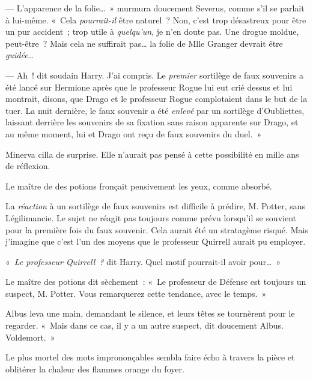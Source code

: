 --- L'apparence de la folie…~»
murmura doucement Severus, comme s'il se parlait à lui-même.
«~Cela \emph{pourrait-il} être naturel~?
Non, c'est trop désastreux pour être un pur accident~; trop utile à \emph{quelqu'un}, je n'en doute pas.
Une drogue moldue, peut-être~?
Mais cela ne suffirait pas… la folie de Mlle Granger devrait être \emph{guidée}…

--- Ah~! dit soudain Harry.
J'ai compris.
Le \emph{premier} sortilège de faux souvenirs a été lancé sur Hermione après que le professeur Rogue lui eut crié dessus et lui montrait, disons, que Drago et le professeur Rogue complotaient dans le but de la tuer.
La nuit dernière, le faux souvenir a été \emph{enlevé} par un sortilège d'Oubliettes, laissant derrière les souvenirs de sa fixation sans raison apparente sur Drago, et au même moment, lui et Drago ont reçu de faux souvenirs du duel.~»

Minerva cilla de surprise.
Elle n'aurait pas pensé à cette possibilité en mille ans de réflexion.

Le maître de des potions fronçait pensivement les yeux, comme absorbé.

La \emph{réaction} à un sortilège de faux souvenirs est difficile à prédire, M. Potter, sans Légilimancie.
Le sujet ne réagit pas toujours comme prévu lorsqu'il se souvient pour la première fois du faux souvenir.
Cela aurait été un stratagème risqué.
Mais j'imagine que c'est l'un des moyens que le professeur Quirrell aurait pu employer.

«~\emph{Le professeur Quirrell~?} dit Harry.
Quel motif pourrait-il avoir pour…~»

Le maître des potions dit sèchement~: «~Le professeur de Défense est toujours un suspect, M. Potter.
Vous remarquerez cette tendance, avec le temps.~»

Albus leva une main, demandant le silence, et leurs têtes se tournèrent pour le regarder.
«~Mais dans ce cas, il y a un autre suspect, dit doucement Albus.
Voldemort.~»

Le plus mortel des mots imprononçables sembla faire écho à travers la pièce et oblitérer la chaleur des flammes orange du foyer.

